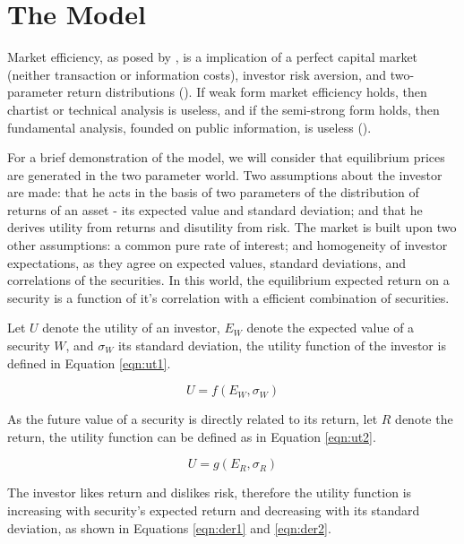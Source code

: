 \documentclass[cic,tc, english]{iiufrgs}
\begin{document}
\chapter{The Model} \label{chapter_model}

    Market efficiency, as posed by \citet{fama1970}, is a implication of a perfect capital market (neither transaction or information costs), investor risk aversion, and two-parameter return distributions (\citet{famamcbeth1973}). If weak form market efficiency holds, then chartist or technical analysis is useless, and if the semi-strong form holds, then fundamental analysis, founded on public information, is useless (\citet{oprean2012}).

    For a brief demonstration of the model, we will consider that equilibrium prices are generated in the two parameter \citet{sharpe1964} world. Two assumptions about the investor are made: that he acts in the basis of two parameters of the distribution of returns of an asset - its expected value and standard deviation; and that he derives utility from returns and disutility from risk. The market is built upon two other assumptions: a common pure rate of interest; and homogeneity of investor expectations, as they agree on expected values, standard deviations, and correlations of the securities. In this world, the equilibrium expected return on a security is a function of it's correlation with a efficient combination of securities.
    
    Let $U$ denote the utility of an investor, $E_W$ denote the expected value of a security $W$, and $\sigma_W$ its standard deviation, the utility function of the investor is defined in Equation \ref{eqn:ut1}.
    
    \begin{equation}
        \label{eqn:ut1}
        U = f(E_W, \sigma_W)
    \end{equation}
    
    As the future value of a security is directly related to its return, let $R$ denote the return, the utility function can be defined as in Equation \ref{eqn:ut2}.

    \begin{equation}
        \label{eqn:ut2}
        U = g(E_R, \sigma_R)
    \end{equation}

    The investor likes return and dislikes risk, therefore the utility function is increasing with security's expected return and decreasing with its standard deviation, as shown in Equations \ref{eqn:der1} and \ref{eqn:der2}.
    
\end{document}
